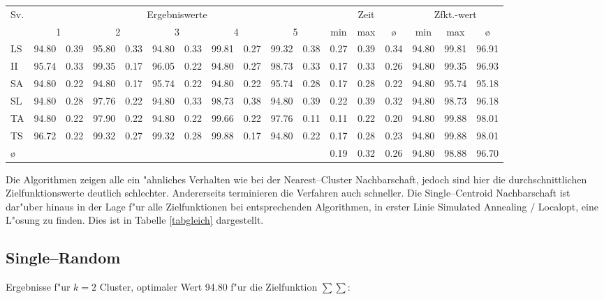 {\footnotesize
\setlength\tabcolsep{0.75mm}
\begin{tabular}{l||rr|rr|rr|rr|rr||ccc||ccc}
Sv. & 
	\multicolumn{10}{c||}{{\normalsize Ergebniswerte} \rule[-1mm]{0mm}{5mm} } &
	\multicolumn{3}{c||}{{\normalsize Zeit}} & 
	\multicolumn{3}{c}{{\normalsize Zfkt.-wert}} \\ 
 &
	\multicolumn{2}{c|}{1} &
	\multicolumn{2}{c|}{2} &
	\multicolumn{2}{c|}{3} &
	\multicolumn{2}{c|}{4} &
	\multicolumn{2}{c||}{5} &
	min & max & {\o} & min & max & {\o}\\
\hline
\hline
LS&94.80&0.39&95.80&0.33&94.80&0.33&99.81&0.27&99.32&0.38&0.27&0.39&0.34&94.80&99.81&96.91\\
II&95.74&0.33&99.35&0.17&96.05&0.22&94.80&0.27&98.73&0.33&0.17&0.33&0.26&94.80&99.35&96.93\\
SA&94.80&0.22&94.80&0.17&95.74&0.22&94.80&0.22&95.74&0.28&0.17&0.28&0.22&94.80&95.74&95.18\\
SL&94.80&0.28&97.76&0.22&94.80&0.33&98.73&0.38&94.80&0.39&0.22&0.39&0.32&94.80&98.73&96.18\\
TA&94.80&0.22&97.90&0.22&94.80&0.22&99.66&0.22&97.76&0.11&0.11&0.22&0.20&94.80&99.88&98.01\\
TS&96.72&0.22&99.32&0.27&99.32&0.28&99.88&0.17&94.80&0.22&0.17&0.28&0.23&94.80&99.88&98.01\\
\hline
\multicolumn{1}{l}{{\o}} & \multicolumn{10}{c}{\quad} & 0.19&0.32&\multicolumn{1}{c}{0.26} & 94.80&98.88&96.70
\end{tabular}
}

Die Algorithmen zeigen alle ein "ahnliches Verhalten wie bei der 
Nearest--Cluster Nachbarschaft, jedoch sind hier die durchschnittlichen
Zielfunktionswerte deutlich schlechter. Andererseits terminieren die 
Verfahren auch schneller. Die Single--Centroid Nachbarschaft ist dar"uber
hinaus in der Lage f"ur alle Zielfunktionen bei entsprechenden Algorithmen,
in erster Linie Simulated Annealing / Localopt, eine L"osung zu finden.
Dies ist in Tabelle \ref{tabgleich} dargestellt.

\subsection*{Single--Random}

Ergebnisse f"ur $k=2$ Cluster, optimaler Wert 94.80 f"ur die Zielfunktion 
$\sum\sum$:

